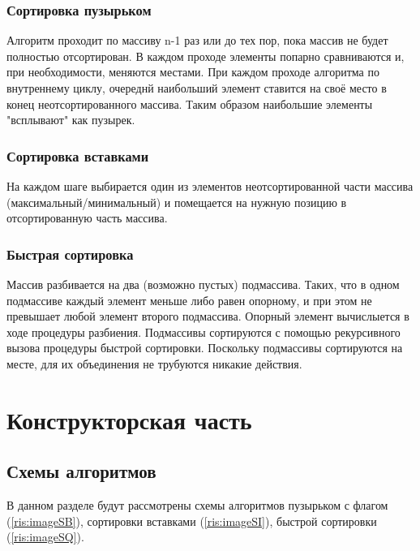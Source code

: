 \documentclass[12pt]{report}
\begin{document}
\subsection{Сортировка пузырьком}
Алгоритм проходит по массиву {n-1} раз или до тех пор, пока массив не будет полностью отсортирован. 
В каждом проходе элементы попарно сравниваются и, при необходимости, меняются местами.
При каждом проходе алгоритма по внутреннему циклу, очереднй наибольший элемент ставится на своё место в конец неотсортированного массива. 
Таким образом наибольшие элементы "всплывают" как пузырек. 

\subsection{Сортировка вставками}
На каждом шаге выбирается один из элементов неотсортированной части массива (максимальный/минимальный) 
и помещается на нужную позицию в отсортированную часть массива. 

\subsection {Быстрая сортировка}
Массив разбивается на два (возможно пустых) подмассива. Таких, что в одном подмассиве каждый элемент меньше либо равен опорному, 
и при этом не превышает любой элемент второго подмассива. Опорный элемент вычислыется в ходе процедуры разбиения. 
Подмассивы сортируются с помощью рекурсивного вызова процедуры быстрой сортировки. 
Поскольку подмассивы сортируются на месте, для их объединения не трубуются никакие действия.


\chapter{Конструкторская часть}
\section{Схемы алгоритмов}
В данном разделе будут рассмотрены схемы алгоритмов пузырьком с флагом (\ref{ris:imageSB}), сортировки вставками (\ref{ris:imageSI}), быстрой сортировки (\ref{ris:imageSQ}).
\end{document}

